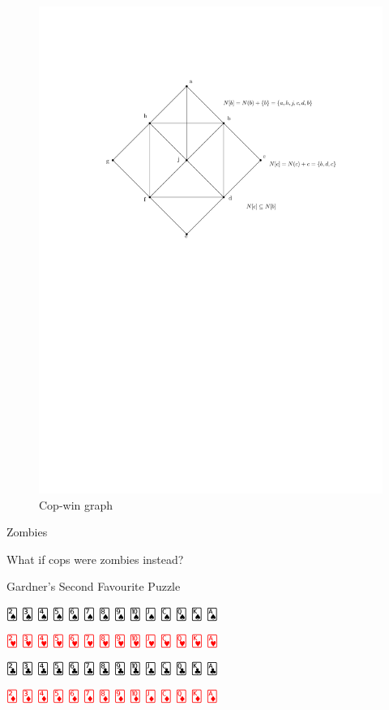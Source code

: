 \documentclass[compress]{beamer}
\begin{document}
\begin{frame}

  \begin{figure}
    \centering
    \includegraphics[width=0.8\framewidth]{img/dismantle2.pdf}
    \caption{Cop-win graph}
  \end{figure}
\end{frame}


\begin{frame}{Zombies}

What if cops were zombies instead?
\end{frame}


\begin{frame}{Gardner's Second Favourite Puzzle}

\bigskip
{ \huge

\textcolor{black}{🂢 	🂣 	🂤 	🂥 	🂦 	🂧 	🂨 	🂩 	🂪 	🂫 	🂬 	🂭 	🂮  🂡}
\bigskip

\textcolor{red}{🂲 	🂳 	🂴 	🂵 	🂶 	🂷 	🂸 	🂹 	🂺 	🂻 	🂼 	🂽 	🂾  🂱}
\bigskip

\textcolor{black}{🃒 	🃓 	🃔 	🃕 	🃖 	🃗 	🃘 	🃙 	🃚 	🃛 	🃜 	🃝 	🃞  🃑}

\bigskip
\textcolor{red}{🃂 	🃃 	🃄 	🃅 	🃆 	🃇 	🃈 	🃉 	🃊 	🃋 	🃌 	🃍 	🃎  🃁}
}
\end{frame}
\end{document}
